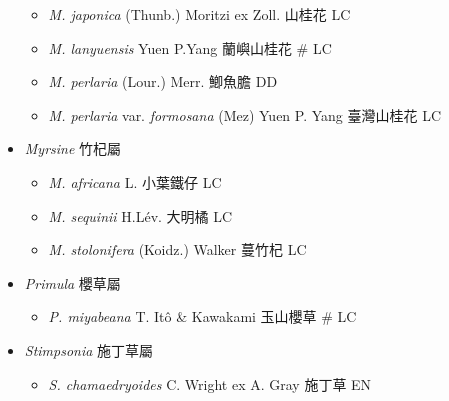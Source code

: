 \begin{itemize}
  \begin{itemize}
        \item[] \textit{M. japonica} (Thunb.) Moritzi ex Zoll.  山桂花   LC
        \item[] \textit{M. lanyuensis} Yuen P.Yang  蘭嶼山桂花  \# LC
        \item[] \textit{M. perlaria} (Lour.) Merr.  鯽魚膽   DD
        \item[] \textit{M. perlaria} var. \textit{formosana} (Mez) Yuen P. Yang  臺灣山桂花   LC
  \end{itemize}
 \item[] \textit{Myrsine} 竹杞屬
                                
  \begin{itemize}
        \item[] \textit{M. africana} L.  小葉鐵仔   LC
        \item[] \textit{M. sequinii} H.Lév.  大明橘   LC
        \item[] \textit{M. stolonifera} (Koidz.) Walker  蔓竹杞   LC
  \end{itemize}
 \item[] \textit{Primula} 櫻草屬
                                
  \begin{itemize}
        \item[] \textit{P. miyabeana} T. Itô \& Kawakami  玉山櫻草  \# LC
  \end{itemize}
 \item[] \textit{Stimpsonia} 施丁草屬
                                
  \begin{itemize}
        \item[] \textit{S. chamaedryoides} C. Wright ex A. Gray  施丁草   EN
  \end{itemize}
  \end{itemize}
